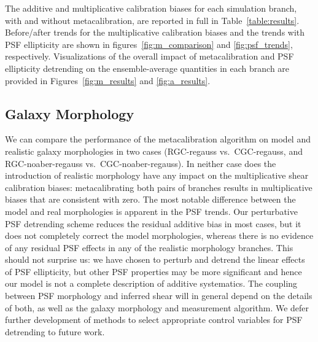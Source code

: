 \documentclass[iop]{emulateapj}
\newcommand\rmcomment[1]{\textcolor{red}{(RM: #1)}}
\begin{document}
The additive and multiplicative calibration biases for each simulation
branch, with and without metacalibration, are reported in full in
Table~\ref{table:results}. Before/after trends for the multiplicative
calibration biases and the trends with PSF ellipticity are shown in
figures~\ref{fig:m_comparison} and \ref{fig:psf_trends},
respectively. Visualizations of the overall impact of metacalibration
and PSF ellipticity detrending on the ensemble-average quantities in
each branch are provided in Figures~\ref{fig:m_results} and
\ref{fig:a_results}.


\subsection{Galaxy Morphology}
We can compare the performance of the metacalibration algorithm on
model and realistic galaxy morphologies in two cases (RGC-regauss vs.\
CGC-regauss, and RGC-noaber-regauss vs.\ CGC-noaber-regauss). In
neither case does the introduction of realistic morphology have any
impact on the multiplicative shear calibration biases: metacalibrating
both pairs of branches results in multiplicative biases that are
consistent with zero.  The most notable difference between the model
and real morphologies is apparent in the PSF trends. Our perturbative
PSF detrending scheme reduces the residual additive bias in most
cases, but it does not completely correct the model morphologies,
whereas there is no evidence of any residual PSF effects in any of the
realistic morphology branches.  This should not surprise us: we have
chosen to perturb and detrend the linear effects of PSF ellipticity,
but other PSF properties may be more significant and hence our model
is not a complete description of additive systematics. The coupling
between PSF morphology and inferred shear will in general depend on
the details of both, as well as the galaxy morphology and measurement
algorithm. We defer further development of methods to select
appropriate control variables for PSF detrending to future work.
\end{document}
